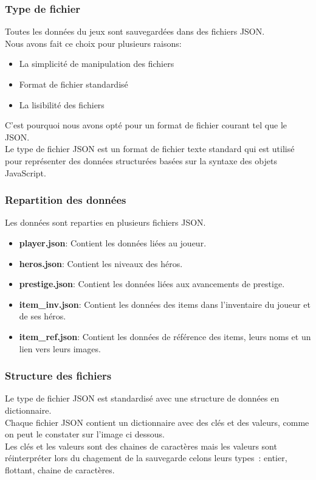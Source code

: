 \documentclass[11pt,a4paper]{article}
\begin{document}
\subsubsection{Type de fichier}
Toutes les données du jeux sont sauvegardées dans des fichiers JSON.\\
Nous avons fait ce choix pour plusieurs raisons:
\begin{itemize}
    \item La simplicité de manipulation des fichiers
    \item Format de fichier standardisé
    \item La lisibilité des fichiers
\end{itemize}
C'est pourquoi nous avons opté pour un format de fichier courant tel que le JSON.\\
Le type de fichier JSON est un format de fichier texte standard qui est utilisé pour représenter des données structurées basées sur la syntaxe des objets JavaScript. 

\subsubsection{Repartition des données}
Les données sont reparties en plusieurs fichiers JSON.
\begin{itemize}
    \item \textbf{player.json}: Contient les données liées au joueur.
    \item \textbf{heros.json}: Contient les niveaux des héros.
    \item \textbf{prestige.json}: Contient les données liées aux avancements de prestige.
    \item \textbf{item\_inv.json}: Contient les données des items dans l'inventaire du joueur et de ses héros.
    \item \textbf{item\_ref.json}: Contient les données de référence des items, leurs noms et un lien vers leurs images.
\end{itemize}

\subsubsection{Structure des fichiers}
Le type de fichier JSON est standardisé avec une structure de données en dictionnaire.\\
Chaque fichier JSON contient un dictionnaire avec des clés et des valeurs, comme on peut le constater sur l'image ci dessous.\\
Les clés et les valeurs sont des chaines de caractères mais les valeurs sont réinterpréter lors du chagement de la sauvegarde celons leurs types~: entier, flottant, chaine de caractères.\\
\end{document}
